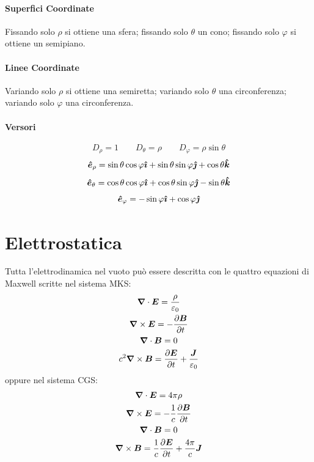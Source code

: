 \subsubsection{Superfici Coordinate}
Fissando solo $\rho$ si ottiene una sfera; fissando solo $\theta$ un cono; fissando solo $\varphi$ si ottiene un semipiano.
\subsubsection{Linee Coordinate}
Variando solo $\rho$ si ottiene una semiretta; variando solo $\theta$ una circonferenza; variando solo $\varphi$ una circonferenza.
\subsubsection{Versori}
\[D_\rho=1\qquad D_\theta=\rho\qquad D_\varphi=\rho\sin\theta\]
\[\boldsymbol{\hat {e}}_\rho=\sin\theta\cos\varphi\boldsymbol{\hat {\imath}}+\sin\theta\sin\varphi\boldsymbol{\hat {\jmath}}+\cos\theta\boldsymbol{\hat {k}}\]
\[\boldsymbol{\hat {e}}_\theta=\cos\theta\cos\varphi\boldsymbol{\hat {\imath}}+\cos\theta\sin\varphi\boldsymbol{\hat {\jmath}}-\sin\theta\boldsymbol{\hat {k}}\]
\[\boldsymbol{\hat {e}}_\varphi=-\sin\varphi\boldsymbol{\hat {\imath}}+\cos\varphi\boldsymbol{\hat {\jmath}}\]

\chapter{Elettrostatica}
\minitoc
Tutta l'elettrodinamica nel vuoto può essere descritta con le quattro equazioni di Maxwell
 scritte nel sistema MKS:
\begin{subequations}
  \begin{gather}
    \boldsymbol{\nabla}\cdot\boldsymbol{E}=\frac{\rho}{\varepsilon_0}\\
    \boldsymbol{\nabla}\times\boldsymbol{E}=-\frac{\partial \boldsymbol{B}}{\partial t}\\
    \boldsymbol{\nabla} \cdot \boldsymbol{B}=0\\
    c^2\boldsymbol{\nabla}\times \boldsymbol{B}=\frac{\partial \boldsymbol{E}}{\partial t}+\frac{\boldsymbol{J}}{\varepsilon_0}
  \end{gather}
\end{subequations}
oppure nel sistema CGS:
\begin{subequations}
  \begin{gather}
    \boldsymbol{\nabla}\cdot\boldsymbol{E}=4\pi\rho\\
    \boldsymbol{\nabla}\times\boldsymbol{E}=-\frac{1}{c}\frac{\partial \boldsymbol{B}}{\partial t}\\
    \boldsymbol{\nabla} \cdot \boldsymbol{B}=0\\
    \boldsymbol{\nabla}\times \boldsymbol{B}=\frac{1}{c}\frac{\partial \boldsymbol{E}}{\partial t}+\frac{4\pi}{c}\boldsymbol{J}
  \end{gather}
\end{subequations}

